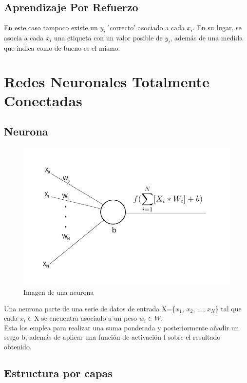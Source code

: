 \subsection{Aprendizaje Por Refuerzo}

En este caso tampoco existe un $y_i$ 'correcto' asociado a cada $x_i$. En su lugar, se asocia a cada $x_i$ una etiqueta con un valor posible de $y_i$, además de una medida que indica como de bueno es el mismo. \cite{Learning_From_Data}


\section{Redes Neuronales Totalmente Conectadas}

\subsection{Neurona}

\begin{figure}[H]
	\centering
	\includegraphics[scale=0.35]{imagenes/neurona.jpg}  
	\caption{Imagen de una neurona}
	\label{fig:neurona}
\end{figure}

Una neurona parte de una serie de datos de entrada X=\{$x_1$, $x_2$, ..., $x_N$\} tal que cada $x_i$$\in${X} se encuentra asociado a un peso $w_i\in{W}$. \\
Esta los emplea para realizar una suma ponderada y posteriormente añadir un sesgo b, además de aplicar una función de activación f sobre el resultado obtenido. 

\subsection{Estructura por capas}


